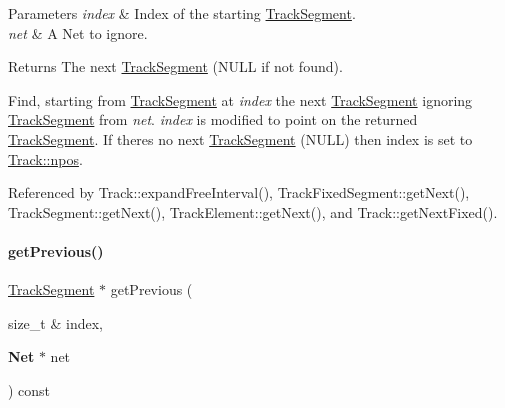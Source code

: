 \begin{DoxyParams}{Parameters}
{\em index} & Index of the starting \mbox{\hyperlink{classKite_1_1TrackSegment}{Track\+Segment}}. \\
\hline
{\em net} & A {\ttfamily Net} to ignore. \\
\hline
\end{DoxyParams}
\begin{DoxyReturn}{Returns}
The next \mbox{\hyperlink{classKite_1_1TrackSegment}{Track\+Segment}} ({\ttfamily N\+U\+LL} if not found).
\end{DoxyReturn}
Find, starting from \mbox{\hyperlink{classKite_1_1TrackSegment}{Track\+Segment}} at {\itshape index} the next \mbox{\hyperlink{classKite_1_1TrackSegment}{Track\+Segment}} ignoring \mbox{\hyperlink{classKite_1_1TrackSegment}{Track\+Segment}} from {\itshape net}. {\itshape index} is modified to point on the returned \mbox{\hyperlink{classKite_1_1TrackSegment}{Track\+Segment}}. If there\textquotesingle{}s no next \mbox{\hyperlink{classKite_1_1TrackSegment}{Track\+Segment}} ({\ttfamily N\+U\+LL}) then index is set to \mbox{\hyperlink{classKite_1_1Track_ae0070ea45b2592ce3701ab9e486e58a0}{Track\+::npos}}. 

Referenced by Track\+::expand\+Free\+Interval(), Track\+Fixed\+Segment\+::get\+Next(), Track\+Segment\+::get\+Next(), Track\+Element\+::get\+Next(), and Track\+::get\+Next\+Fixed().

\mbox{\label{classKite_1_1Track_a290fcfe6131730d216951a3b5207d777}} 
\paragraph{\texorpdfstring{get\+Previous()}{getPrevious()}}
{\footnotesize\ttfamily \mbox{\hyperlink{classKite_1_1TrackSegment}{Track\+Segment}} $\ast$ get\+Previous (\begin{DoxyParamCaption}\item[{size\+\_\+t \&}]{index,  }\item[{\textbf{ Net} $\ast$}]{net }\end{DoxyParamCaption}) const}


